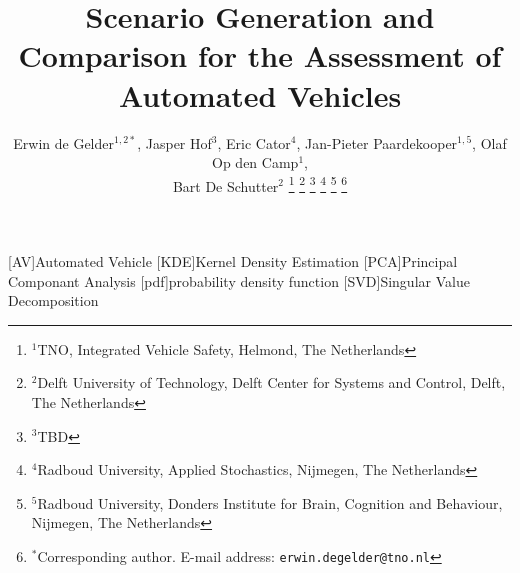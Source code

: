 \documentclass[conference, a4paper]{ieeeconf}
\title{Scenario Generation and Comparison for the Assessment of Automated Vehicles}
\author{Erwin de Gelder$^{1,2*}$, Jasper Hof$^{3}$, Eric Cator$^{4}$, Jan-Pieter Paardekooper$^{1,5}$, Olaf Op den Camp$^{1}$, \\Bart De Schutter$^{2}$%
\thanks{$^{1}$TNO, Integrated Vehicle Safety, Helmond, The Netherlands}%
\thanks{$^{2}$Delft University of Technology, Delft Center for Systems and Control, Delft, The Netherlands}%
\thanks{$^{3}$TBD}%
\thanks{$^{4}$Radboud University, Applied Stochastics, Nijmegen, The Netherlands}%
\thanks{$^{5}$Radboud University, Donders Institute for Brain, Cognition and Behaviour, Nijmegen, The Netherlands}%
\thanks{$^{*}$Corresponding author. \newline E-mail address: {\tt\small erwin.degelder@tno.nl}}}%
\date{}
\theoremstyle{plain}
\theoremstyle{remark}\newtheorem{remarkenv}{Remark}        %
\begin{document}
\begin{acronym}[AAAAAAAA]
	[AV]{Automated Vehicle}
	[KDE]{Kernel Density Estimation}
	[PCA]{Principal Componant Analysis}
	[pdf]{probability density function}
	[SVD]{Singular Value Decomposition}
\end{acronym}

\maketitle


\acresetall





\acresetall





\printbibliography
\end{document}
